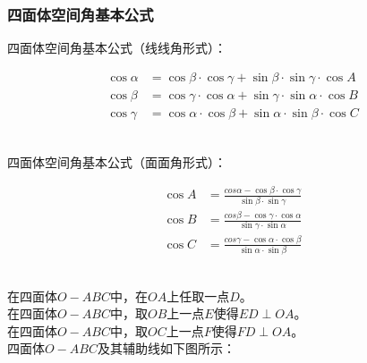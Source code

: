 \documentclass[UTF8]{ctexart}
\begin{document}
\subsubsection{四面体空间角基本公式}
    四面体空间角基本公式（线线角形式）：
    \begin{large}
        \begin{align*}
            \cos{\alpha}&=\cos{\beta}\cdot\cos{\gamma}+\sin{\beta}\cdot\sin{\gamma}\cdot\cos{A}\\[3mm]
            \cos{\beta}&=\cos{\gamma}\cdot\cos{\alpha}+\sin{\gamma}\cdot\sin{\alpha}\cdot\cos{B}\\[3mm]
            \cos{\gamma}&=\cos{\alpha}\cdot\cos{\beta}+\sin{\alpha}\cdot\sin{\beta}\cdot\cos{C}
        \end{align*}
    \end{large}\\
    四面体空间角基本公式（面面角形式）：
    \begin{large}
        \begin{align*}
            \cos{A}&=\frac{cos{\alpha}-\cos{\beta}\cdot\cos{\gamma}}{\sin{\beta}\cdot\sin{\gamma}}\\[3mm]
            \cos{B}&=\frac{cos{\beta}-\cos{\gamma}\cdot\cos{\alpha}}{\sin{\gamma}\cdot\sin{\alpha}}\\[3mm]
            \cos{C}&=\frac{cos{\gamma}-\cos{\alpha}\cdot\cos{\beta}}{\sin{\alpha}\cdot\sin{\beta}}
        \end{align*}
    \end{large}\\
    在四面体$O-ABC$中，在$OA$上任取一点$D$。\\[2mm]
    在四面体$O-ABC$中，取$OB$上一点$E$使得$ED\perp OA$。\\[2mm]
    在四面体$O-ABC$中，取$OC$上一点$F$使得$FD\perp OA$。\\[4mm]
    四面体$O-ABC$及其辅助线如下图所示：\vspace{-5pt}
\end{document}
